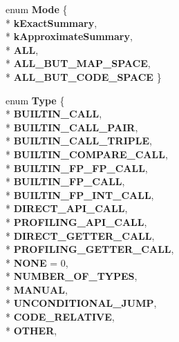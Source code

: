 \begin{DoxyCompactItemize}
\item 
enum {\bfseries Mode} \{ \\*
{\bfseries k\+Exact\+Summary}, 
\\*
{\bfseries k\+Approximate\+Summary}, 
\\*
{\bfseries A\+LL}, 
\\*
{\bfseries A\+L\+L\+\_\+\+B\+U\+T\+\_\+\+M\+A\+P\+\_\+\+S\+P\+A\+CE}, 
\\*
{\bfseries A\+L\+L\+\_\+\+B\+U\+T\+\_\+\+C\+O\+D\+E\+\_\+\+S\+P\+A\+CE}
 \}\hypertarget{classv8_1_1internal_1_1_b_a_s_e___e_m_b_e_d_d_e_d_af8f1017bb278d327a70ab5e29c7cad84}{}\label{classv8_1_1internal_1_1_b_a_s_e___e_m_b_e_d_d_e_d_af8f1017bb278d327a70ab5e29c7cad84}

\item 
enum {\bfseries Type} \{ \\*
{\bfseries B\+U\+I\+L\+T\+I\+N\+\_\+\+C\+A\+LL}, 
\\*
{\bfseries B\+U\+I\+L\+T\+I\+N\+\_\+\+C\+A\+L\+L\+\_\+\+P\+A\+IR}, 
\\*
{\bfseries B\+U\+I\+L\+T\+I\+N\+\_\+\+C\+A\+L\+L\+\_\+\+T\+R\+I\+P\+LE}, 
\\*
{\bfseries B\+U\+I\+L\+T\+I\+N\+\_\+\+C\+O\+M\+P\+A\+R\+E\+\_\+\+C\+A\+LL}, 
\\*
{\bfseries B\+U\+I\+L\+T\+I\+N\+\_\+\+F\+P\+\_\+\+F\+P\+\_\+\+C\+A\+LL}, 
\\*
{\bfseries B\+U\+I\+L\+T\+I\+N\+\_\+\+F\+P\+\_\+\+C\+A\+LL}, 
\\*
{\bfseries B\+U\+I\+L\+T\+I\+N\+\_\+\+F\+P\+\_\+\+I\+N\+T\+\_\+\+C\+A\+LL}, 
\\*
{\bfseries D\+I\+R\+E\+C\+T\+\_\+\+A\+P\+I\+\_\+\+C\+A\+LL}, 
\\*
{\bfseries P\+R\+O\+F\+I\+L\+I\+N\+G\+\_\+\+A\+P\+I\+\_\+\+C\+A\+LL}, 
\\*
{\bfseries D\+I\+R\+E\+C\+T\+\_\+\+G\+E\+T\+T\+E\+R\+\_\+\+C\+A\+LL}, 
\\*
{\bfseries P\+R\+O\+F\+I\+L\+I\+N\+G\+\_\+\+G\+E\+T\+T\+E\+R\+\_\+\+C\+A\+LL}, 
\\*
{\bfseries N\+O\+NE} = 0, 
\\*
{\bfseries N\+U\+M\+B\+E\+R\+\_\+\+O\+F\+\_\+\+T\+Y\+P\+ES}, 
\\*
{\bfseries M\+A\+N\+U\+AL}, 
\\*
{\bfseries U\+N\+C\+O\+N\+D\+I\+T\+I\+O\+N\+A\+L\+\_\+\+J\+U\+MP}, 
\\*
{\bfseries C\+O\+D\+E\+\_\+\+R\+E\+L\+A\+T\+I\+VE}, 
\\*
{\bfseries O\+T\+H\+ER}, 

\end{DoxyCompactItemize}
